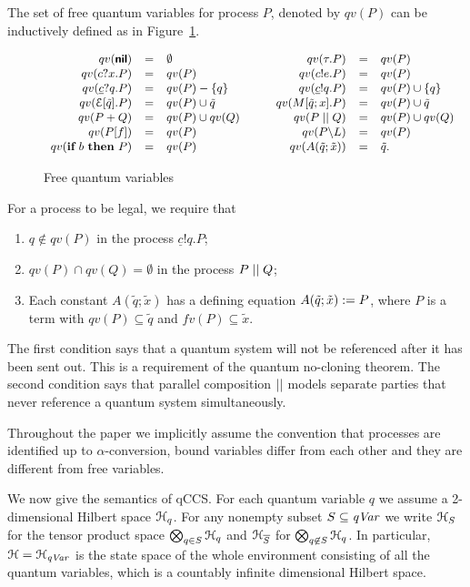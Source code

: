\documentclass[a4paper,UKenglish,cleveref, autoref]{lipics-v2019}
\newcommand{\qc}{\underline{c}}
\newcommand{\qVar}{{\it qVar}}
\newcommand{\CE}{{\cal E}}
\newcommand{\CH}{{\cal H}}
\newcommand{\ifthen}[2]{{\textbf{if} ~#1~ \textbf{then} ~#2}}
\begin{document}
The set of free quantum variables for process $P$, denoted by $qv(P)$ can be inductively defined as in Figure~\ref{fig:fqv}.
\begin{figure}[t]
	\[\small\begin{array}{rclrcl}
	qv(\Cnil) & = & \emptyset & qv(\tau.P) & = & qv(P)\\
	qv(c?x.P) & = & qv(P) & qv(c!e.P) & = & qv(P) \\
	qv(\qc?q.P) & = & qv(P)-\sset{q} & qv(\qc!q.P) & = & qv(P)\cup\sset{q} \\
	qv(\CE[\tilde{q}].P) & = & qv(P)\cup \tilde{q} &
	qv(M[\tilde{q};x].P) & = & qv(P) \cup \tilde{q}\\
	qv(P+Q) & = & qv(P)\cup qv(Q) \qquad &
	qv(P \Cpar Q) & = & qv(P)\cup qv(Q)\\
	qv(P[f]) & = & qv(P) &
	qv(P\backslash L) & = & qv(P)\\
	qv(\ifthen{b}{P}) & = & qv(P) &
	qv(A(\tilde{q};\tilde{x})) & = & \tilde{q}.
	\end{array}\]
	\caption{Free quantum variables}\label{fig:fqv}
\end{figure}
For a process to be legal, we require that
\begin{enumerate}
	\item $q\not\in qv(P)$ in the process $\qc!q.P$;
	\item $qv(P)\cap qv(Q)=\emptyset$ in the process $P \mathrel{||} Q$;
	\item Each constant $A(\tilde{q};\tilde{x})$ has a defining equation $A(\tilde{q};\tilde{x}) \mathrel{:=} P$, where $P$ is a term with $qv(P)\subseteq\tilde{q}$ and $fv(P)\subseteq \tilde{x}$.
\end{enumerate}
The first condition says that a quantum system will not be referenced after it has been sent out. This is a requirement of the quantum no-cloning theorem. The second condition says that parallel composition $\mathrel{||}$ models separate parties that never reference a quantum system simultaneously. 

Throughout the paper we implicitly assume the convention that processes are identified up to $\alpha$-conversion, bound variables differ from each other and they are different from free variables.

We now give the %
semantics of qCCS. For each quantum variable $q$ we assume a 2-dimensional Hilbert space $\CH_q$. For any nonempty subset $S\subseteq \qVar$ we write $\CH_S$ for the tensor product space $\bigotimes_{q\in S}\CH_q$ and $\CH_{\overline{S}}$ for $\bigotimes_{q\not\in S}\CH_q$. In particular, $\CH=\CH_{\qVar}$ is the state space of the whole environment consisting of all the quantum variables, which is a countably infinite dimensional Hilbert space.
\end{document}
